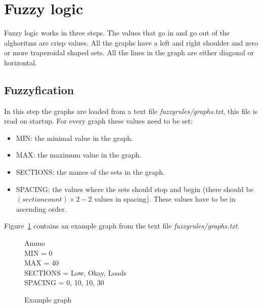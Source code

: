 \documentclass[10pt]{extarticle} %
\begin{document}
    \newpage
   \section {Fuzzy logic}
   Fuzzy logic works in three steps. The values that go in and go out of the alghoritms are crisp values. All the graphs have a left and right shoulder and zero or more trapezoidal shaped sets. All the lines in the graph are either diagonal or horizontal.
   \subsection{Fuzzyfication}
   In this step the graphs are loaded from a text file \emph{fuzzyrules/graphs.txt}, this file is read on startup. For every graph these values need to be set: 
   \begin{itemize}
   \item MIN: the minimal value in the graph.
   \item MAX: the maximum value in the graph.
   \item SECTIONS: the names of the sets in the graph.
   \item SPACING: the values where the sets should stop and begin (there should be \( (section count) \times 2 - 2\) values in spacing). These values have to be in ascending order.
   \end{itemize}
Figure~\ref{fig:fuzzygraph} contains an example graph from the text file \emph{fuzzyrules/graphs.txt}.
   \begin{figure}[h!]
   {\ttfamily 
   		Ammo\\
		MIN = 0\\
		MAX = 40\\
		SECTIONS = Low, Okay, Loads\\
		SPACING = 0, 10, 10, 30  \\
   }
   \caption{Example graph}
   \label{fig:fuzzygraph}
   \end{figure}\\
   
   
\end{document}
